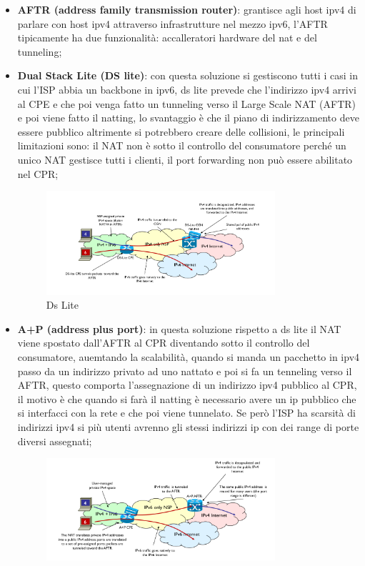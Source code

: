 \documentclass[12pt]{article}
\begin{document}
\begin{itemize}
    \item \textbf{AFTR (address family transmission router)}: grantisce agli host ipv4 di parlare con host ipv4 attraverso infrastrutture nel mezzo ipv6, l'AFTR tipicamente ha due funzionalit\`a: accalleratori hardware del nat e del tunneling;
    \item \textbf{Dual Stack Lite (DS lite)}: con questa soluzione si gestiscono tutti i casi in cui l'ISP abbia un backbone in ipv6, ds lite prevede che l'indirizzo ipv4 arrivi al CPE e che poi venga fatto un tunneling verso il Large Scale NAT (AFTR) e poi viene fatto il natting, lo svantaggio \`e che il piano di indirizzamento deve essere pubblico altrimente si potrebbero creare delle collisioni, le principali limitazioni sono: il NAT non \`e sotto il controllo del consumatore perch\'e un unico NAT gestisce tutti i clienti, il port forwarding non pu\`o essere abilitato nel CPR;
        \begin{figure}[H]
            \centering
            \includegraphics[width=0.8\textwidth]{ds-lite.png}
            \caption{Ds Lite}
            \label{fig:ds-lite}
        \end{figure}
    \item \textbf{A+P (address plus port)}: in questa soluzione rispetto a ds lite il NAT viene spostato dall'AFTR al CPR diventando sotto il controllo del consumatore, auemtando la scalabilit\`a, quando si manda un pacchetto in ipv4 passo da un indirizzo privato ad uno nattato e poi si fa un tenneling verso il AFTR, questo comporta l'assegnazione di un indirizzo ipv4 pubblico al CPR, il motivo \`e che quando si far\`a il natting \`e necessario avere un ip pubblico che si interfacci con la rete e che poi viene tunnelato. Se per\`o l'ISP ha scarsit\`a di indirizzi ipv4 si pi\`u utenti avrenno gli stessi indirizzi ip con dei range di porte diversi assegnati;
        \begin{figure}[H]
            \centering
            \includegraphics[width=0.8\textwidth]{a+p.png}

\end{figure}
\end{itemize}
\end{document}

